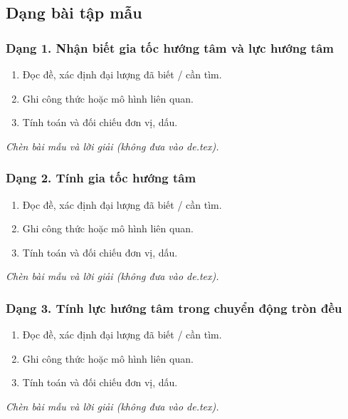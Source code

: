 

\subsection{Dạng bài tập mẫu}
\subsubsection{Dạng 1. Nhận biết gia tốc hướng tâm và lực hướng tâm}
\begin{phuongphap}
\begin{enumerate}
\item Đọc đề, xác định đại lượng đã biết / cần tìm.
\item Ghi công thức hoặc mô hình liên quan.
\item Tính toán và đối chiếu đơn vị, dấu.
\end{enumerate}
\end{phuongphap}
\begin{vidumau}
\textit{Chèn bài mẫu và lời giải (không đưa vào de.tex).}
\end{vidumau}

\subsubsection{Dạng 2. Tính gia tốc hướng tâm}
\begin{phuongphap}
\begin{enumerate}
\item Đọc đề, xác định đại lượng đã biết / cần tìm.
\item Ghi công thức hoặc mô hình liên quan.
\item Tính toán và đối chiếu đơn vị, dấu.
\end{enumerate}
\end{phuongphap}
\begin{vidumau}
\textit{Chèn bài mẫu và lời giải (không đưa vào de.tex).}
\end{vidumau}

\subsubsection{Dạng 3. Tính lực hướng tâm trong chuyển động tròn đều}
\begin{phuongphap}
\begin{enumerate}
\item Đọc đề, xác định đại lượng đã biết / cần tìm.
\item Ghi công thức hoặc mô hình liên quan.
\item Tính toán và đối chiếu đơn vị, dấu.
\end{enumerate}
\end{phuongphap}
\begin{vidumau}
\textit{Chèn bài mẫu và lời giải (không đưa vào de.tex).}
\end{vidumau}

